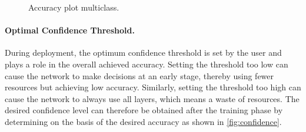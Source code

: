 \documentclass[conference]{IEEEtran}
\begin{document}
\begin{figure}
\centering
{}
\caption{Accuracy plot multiclass.}
\end{figure}

\paragraph{Optimal Confidence Threshold.}
During deployment, the optimum confidence threshold is set by the user and plays a role in the overall achieved accuracy. Setting the threshold too low can cause the network to make decisions at an early stage, thereby using fewer resources but achieving low accuracy. Similarly, setting the threshold too high can cause the network to always use all layers, which means a waste of resources. The desired confidence level can therefore be obtained after the training phase by determining on the basis of the desired accuracy as shown in \autoref{fig:confidence}.
\end{document}
